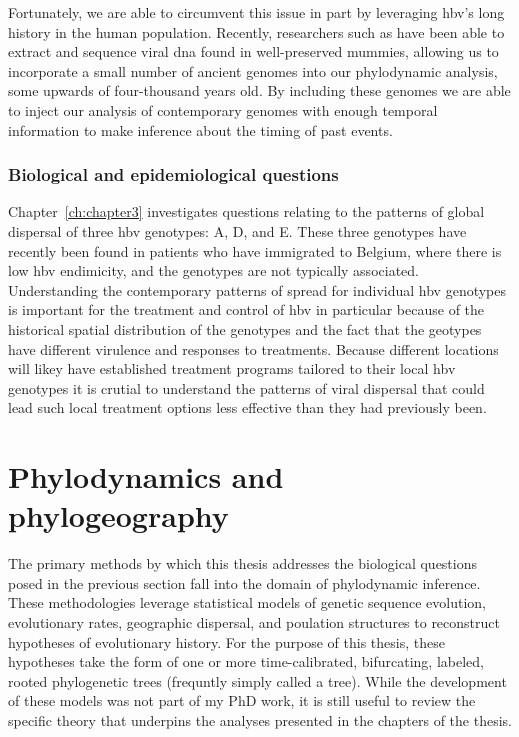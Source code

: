 Fortunately, we are able to circumvent this issue in part by leveraging \gls{hbv}'s long history in the human population.
Recently, researchers such as \citet{muhlemann2018ancient} have been able to extract and sequence viral \gls{dna} found in well-preserved mummies, allowing us to incorporate a small number of ancient genomes into our phylodynamic analysis, some upwards of four-thousand years old.
By including these genomes we are able to inject our analysis of contemporary genomes with enough temporal information to make inference about the timing of past events.

\subsubsection{Biological and epidemiological questions}
Chapter~\ref{ch:chapter3} investigates questions relating to the patterns of global dispersal of three \gls{hbv} genotypes: A, D, and E.
These three genotypes have recently been found in patients who have immigrated to Belgium, where there is low \gls{hbv} endimicity, and the genotypes are not typically associated.
Understanding the contemporary patterns of spread for individual \gls{hbv} genotypes is important for the treatment and control of \gls{hbv} in particular because of the historical spatial distribution of the genotypes and the fact that the geotypes have different virulence and responses to treatments.
Because different locations will likey have established treatment programs tailored to their local \gls{hbv} genotypes it is crutial to understand the patterns of viral dispersal that could lead such local treatment options less effective than they had previously been.

\section{Phylodynamics and phylogeography}
The primary methods by which this thesis addresses the biological questions posed in the previous section fall into the domain of phylodynamic inference.
These methodologies leverage statistical models of genetic sequence evolution, evolutionary rates, geographic dispersal, and poulation structures to reconstruct hypotheses of evolutionary history.
For the purpose of this thesis, these hypotheses take the form of one or more time-calibrated, bifurcating, labeled, rooted phylogenetic trees (frequntly simply called a tree).
While the development of these models was not part of my PhD work, it is still useful to review the specific theory that underpins the analyses presented in the chapters of the thesis.

